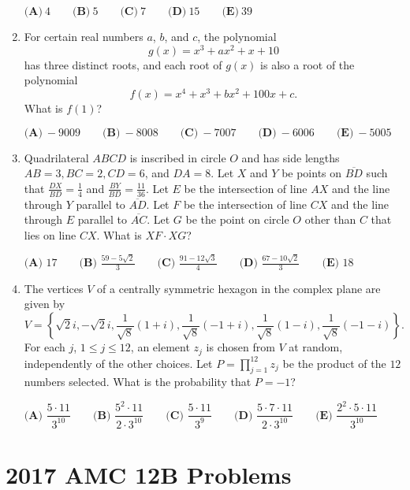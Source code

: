\documentclass{article}
\begin{document}
\begin{enumerate}[label=\arabic*., itemsep=0.5em]
\(\textbf{(A)}\ 4 \qquad \textbf{(B)}\ 5 \qquad\textbf{(C)}\ 7 \qquad\textbf{(D)}\ 15 \qquad\textbf{(E)}\ 39\)\par \vspace{0.5em}\item For certain real numbers \(a\), \(b\), and \(c\), the polynomial 
\begin{equation*}
g(x) = x^3 + ax^2 + x + 10
\end{equation*}
has three distinct roots, and each root of \(g(x)\) is also a root of the polynomial 
\begin{equation*}
f(x) = x^4 + x^3 + bx^2 + 100x + c.
\end{equation*}
What is \(f(1)\)?

\(\textbf{(A)}\ -9009 \qquad\textbf{(B)}\ -8008 \qquad\textbf{(C)}\ -7007 \qquad\textbf{(D)}\ -6006 \qquad\textbf{(E)}\ -5005\)\par \vspace{0.5em}\item Quadrilateral \(ABCD\) is inscribed in circle \(O\) and has side lengths \(AB=3, BC=2, CD=6\), and \(DA=8\). Let \(X\) and \(Y\) be points on \(\overline{BD}\) such that \(\frac{DX}{BD} = \frac{1}{4}\) and \(\frac{BY}{BD} = \frac{11}{36}\). Let \(E\) be the intersection of line \(AX\) and the line through \(Y\) parallel to \(\overline{AD}\). Let \(F\) be the intersection of line \(CX\) and the line through \(E\) parallel to \(\overline{AC}\). Let \(G\) be the point on circle \(O\) other than \(C\) that lies on line \(CX\). What is \(XF\cdot XG\)?

\(\textbf{(A) }17\qquad\textbf{(B) }\frac{59 - 5\sqrt{2}}{3}\qquad\textbf{(C) }\frac{91 - 12\sqrt{3}}{4}\qquad\textbf{(D) }\frac{67 - 10\sqrt{2}}{3}\qquad\textbf{(E) }18\)\par \vspace{0.5em}\item The vertices \(V\) of a centrally symmetric hexagon in the complex plane are given by 
\begin{equation*}
V=\left\{   \sqrt{2}i,-\sqrt{2}i, \frac{1}{\sqrt{8}}(1+i),\frac{1}{\sqrt{8}}(-1+i),\frac{1}{\sqrt{8}}(1-i),\frac{1}{\sqrt{8}}(-1-i) \right\}.
\end{equation*}
 For each \(j\), \(1\leq j\leq 12\), an element \(z_j\) is chosen from \(V\) at random, independently of the other choices. Let \(P={\prod}_{j=1}^{12}z_j\) be the product of the \(12\) numbers selected. What is the probability that \(P=-1\)?

\(\textbf{(A) } \dfrac{5\cdot11}{3^{10}} \qquad \textbf{(B) } \dfrac{5^2\cdot11}{2\cdot3^{10}} \qquad \textbf{(C) } \dfrac{5\cdot11}{3^{9}} \qquad \textbf{(D) } \dfrac{5\cdot7\cdot11}{2\cdot3^{10}} \qquad \textbf{(E) } \dfrac{2^2\cdot5\cdot11}{3^{10}}\)\par \vspace{0.5em}\end{enumerate}\newpage\section*{2017 AMC 12B Problems}
\end{document}
